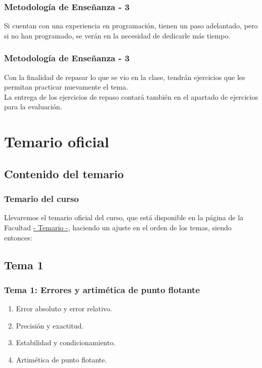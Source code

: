 \documentclass[12pt]{beamer}
\begin{document}
\begin{frame}
\frametitle{Metodología de Enseñanza - 3}
Si cuentan con una experiencia en programación, tienen un paso adelantado, pero si no han programado, se verán en la necesidad de dedicarle más tiempo.
\end{frame}
\begin{frame}
\frametitle{Metodología de Enseñanza - 3}
Con la finalidad de repasar lo que se vio en la clase, tendrán ejercicios que les permitan practicar nuevamente el tema.
\\
\bigskip
\pause
La entrega de los ejercicios de repaso contará también en el apartado de ejercicios para la evaluación.
\end{frame}

\section{Temario oficial}
\subsection{Contenido del temario}

\begin{frame}
\frametitle{Temario del curso}
Llevaremos el temario oficial del curso, que está disponible en la página de la Facultad \href{https://www.fciencias.unam.mx/sites/default/files/temario/715.pdf}{- Temario -}, haciendo un ajuste en el orden de los temas, siendo entonces:
\end{frame}

\subsection*{Tema 1}

\begin{frame}
\frametitle{\textbf{Tema 1: Errores y artimética de punto flotante}}
\begin{enumerate}[<+->]
\item Error absoluto y error relativo.
\item Precisión y exactitud.
\item Estabilidad y condicionamiento.
\item Artimética de punto flotante.
\end{enumerate}
\end{frame}
\end{document}
